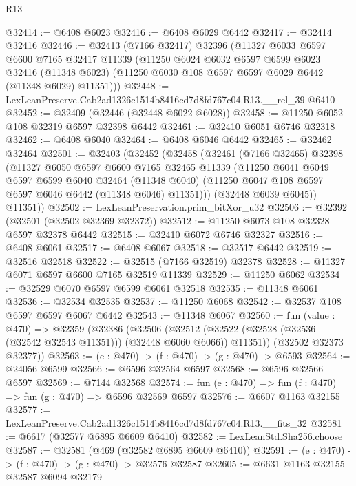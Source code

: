 \begin{lexlean}{R13}
\begin{coremodule}
@32414 := @6408 @6023
@32416 := @6408 @6029 @6442
@32417 := @32414 @32416
@32446 := @32413
    (@7166 @32417)
    @32396
    (@11327
      @6033
      @6597
      @6600
      @7165
      @32417
      @11339
      (@11250
        @6024
        @6032
        @6597
        @6599
        @6023
        @32416
        (@11348 @6023)
        (@11250 @6030 @108 @6597 @6597 @6029 @6442 (@11348 @6029) @11351)))
@32448 := LexLeanPreserve.Cab2ad1326c1514b8416cd7d8fd767c04.R13.__rel_39 @6410
@32452 := @32409 (@32446 (@32448 @6022 @6028))
@32458 := @11250 @6052 @108 @32319 @6597 @32398 @6442
@32461 := @32410 @6051 @6746 @32318
@32462 := @6408 @6040
@32464 := @6408 @6046 @6442
@32465 := @32462 @32464
@32501 := @32403
    (@32452
      (@32458
        (@32461
          (@7166 @32465)
          @32398
          (@11327
            @6050
            @6597
            @6600
            @7165
            @32465
            @11339
            (@11250
              @6041
              @6049
              @6597
              @6599
              @6040
              @32464
              (@11348 @6040)
              (@11250 @6047 @108 @6597 @6597 @6046 @6442 (@11348 @6046) @11351)))
          (@32448 @6039 @6045))
        @11351))
@32502 := LexLeanPreservation.prim_bitXor_u32
@32506 := @32392 (@32501 (@32502 @32369 @32372))
@32512 := @11250 @6073 @108 @32328 @6597 @32378 @6442
@32515 := @32410 @6072 @6746 @32327
@32516 := @6408 @6061
@32517 := @6408 @6067
@32518 := @32517 @6442
@32519 := @32516 @32518
@32522 := @32515 (@7166 @32519) @32378
@32528 := @11327 @6071 @6597 @6600 @7165 @32519 @11339
@32529 := @11250 @6062
@32534 := @32529 @6070 @6597 @6599 @6061 @32518
@32535 := @11348 @6061
@32536 := @32534 @32535
@32537 := @11250 @6068
@32542 := @32537 @108 @6597 @6597 @6067 @6442
@32543 := @11348 @6067
@32560 := fun (value : @470) =>
  @32359
    (@32386
      (@32506
        (@32512 (@32522 (@32528 (@32536 (@32542 @32543 @11351))) (@32448 @6060 @6066)) @11351))
      (@32502 @32373 @32377))
@32563 := (e : @470) -> (f : @470) -> (g : @470) -> @6593
@32564 := @24056 @6599
@32566 := @6596 @32564 @6597
@32568 := @6596 @32566 @6597
@32569 := @7144 @32568
@32574 := fun (e : @470) => fun (f : @470) => fun (g : @470) => @6596 @32569 @6597
@32576 := @6607 @1163 @32155
@32577 := LexLeanPreserve.Cab2ad1326c1514b8416cd7d8fd767c04.R13.__fits_32
@32581 := @6617 (@32577 @6895 @6609 @6410)
@32582 := LexLeanStd.Sha256.choose
@32587 := @32581 (@469 (@32582 @6895 @6609 @6410))
@32591 := (e : @470) -> (f : @470) -> (g : @470) -> @32576 @32587
@32605 := @6631
    @1163
    @32155
    @32587
    @6094
    @32179

\end{coremodule}
\end{lexlean}
